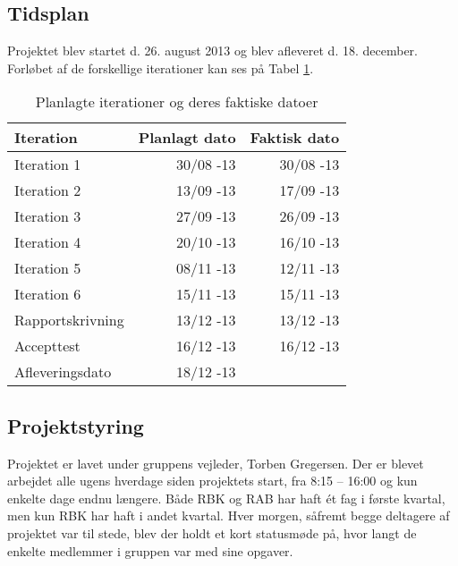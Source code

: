 \documentclass[Main]{subfiles}
\begin{document}
\newpage
\subsection{Tidsplan}
Projektet blev startet d. 26. august 2013 og blev afleveret d. 18. december.
Forløbet af de forskellige iterationer kan ses på Tabel \ref{Tab:Tidsplan}.

\begin{table}[H]
\centering
	\begin{tabular}{l r r}
	\hline
	\textbf{Iteration} & \textbf{Planlagt dato} & \textbf{Faktisk dato} \\ \hline
	Iteration 1 & 30/08 -13 & 30/08 -13\\
	Iteration 2 & 13/09 -13 & 17/09 -13\\
	Iteration 3 & 27/09 -13 & 26/09 -13\\
	Iteration 4 & 20/10 -13 & 16/10 -13\\
	Iteration 5 & 08/11 -13 & 12/11 -13\\
	Iteration 6 & 15/11 -13 & 15/11 -13\\
	Rapportskrivning & 13/12 -13 & 13/12 -13 \\
	Accepttest	& 16/12 -13 & 16/12 -13\\
	Afleveringsdato & 18/12 -13 & 
	\\ \hline
	\end{tabular}
\caption{Planlagte iterationer og deres faktiske datoer}
\label{Tab:Tidsplan}
\end{table}


\subsection{Projektstyring}
Projektet er lavet under gruppens vejleder, Torben Gregersen.
Der er blevet arbejdet alle ugens hverdage siden projektets start, fra 8:15 -- 16:00 og kun enkelte dage endnu længere.
Både RBK og RAB har haft ét fag i første kvartal, men kun RBK har haft i andet kvartal.
Hver morgen, såfremt begge deltagere af projektet var til stede, blev der holdt et kort statusmøde på, hvor langt de enkelte medlemmer i gruppen var med sine opgaver.
\end{document}
